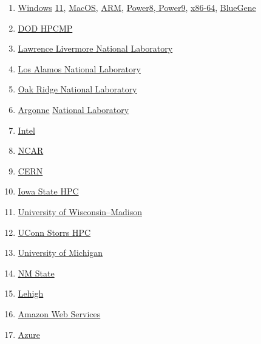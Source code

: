 \documentclass[10pt, oneside]{article}   	%
\begin{document}
\begin{enumerate}
	\item \href{https://ipv6.rs/tutorial/Windows_11/Spack/}{Windows} \href{https://www.kitware.com/spack-on-windows-a-new-era-in-cross-platform-dependency-management/}{11}, \href{https://ipv6.rs/tutorial/macOS/Spack/}{MacOS}, \href{https://en.wikipedia.org/wiki/ARM_architecture_family}{ARM}, \href{https://en.wikipedia.org/wiki/POWER8}{Power8, Power9}, \href{https://en.wikipedia.org/wiki/X86-64}{x86-64}, \href{https://en.wikipedia.org/wiki/IBM_Blue_Gene}{BlueGene}
	\item \href{https://oidc.hwss.hpc.mil/authentication?response_type=code&client_id=FKs5BqquL44U&scope=hpcmp%20openid%20profile&nonce=N66fd6ed373f44&response_mode=form_post&state=D3EvUDabr2Tu1cJ&redirect_uri=https%3A%2F%2Ftraining.hpc.mil%2Fauth%2Foidc%2F&resource=https%3A%2F%2Fgraph.microsoft.com}{DOD HPCMP}
	\item \href{https://computing.llnl.gov/projects/spack-hpc-package-manager}{Lawrence Livermore National Laboratory} 
	\item \href{https://dyninst.github.io/scalable_tools_workshop/petascale2018/assets/slides/Spack%20Shared%20Environment_ScalableTools2018.pdf}{Los Alamos National Laboratory} 
	\item \href{https://docs.olcf.ornl.gov/software/spack_environments.html}{Oak Ridge National Laboratory}
	\item \href{https://www.alcf.anl.gov/support-center/training/software-deployment-spack}{Argonne} \href{https://docs.alcf.anl.gov/polaris/applications-and-libraries/libraries/spack-pe/}{ National Laboratory}
	\item \href{https://www.intel.com/content/www/us/en/developer/articles/technical/distribution-of-optimized-hpc-binaries-using-spack.html}{Intel}
	\item \href{https://ncar-hpc-docs.readthedocs.io/en/latest/environment-and-software/user-environment/spack/spack/}{NCAR} 
	\item \href{https://github.com/HSF/hep-spack}{CERN}
	\item \href{https://www.hpc.iastate.edu/guides/using-spack-to-build-packages}{Iowa State HPC}
	\item \href{https://chtc.cs.wisc.edu/uw-research-computing/hpc-spack-setup}{University of Wisconsin–Madison}
	\item \href{https://kb.uconn.edu/space/SH/26074480709/Spack+Package+Manager}{UConn Storrs HPC}
	\item \href{https://documentation.its.umich.edu/node/5047}{University of Michigan}
	\item \href{https://hpc.nmsu.edu/discovery/software/spack/}{NM State}
	\item \href{https://lehigh.atlassian.net/wiki/spaces/hpc/pages/45252863/Spack}{Lehigh}
	\item \href{https://aws.amazon.com/blogs/hpc/install-optimized-software-with-spack-configs-for-aws-parallelcluster/}{Amazon Web Services}
	\item \href{https://techcommunity.microsoft.com/t5/azure-high-performance-computing/spack-in-a-multi-user-hpc-environment-on-azure/ba-p/3438261s	}{Azure}
\end{enumerate}
\end{document}
